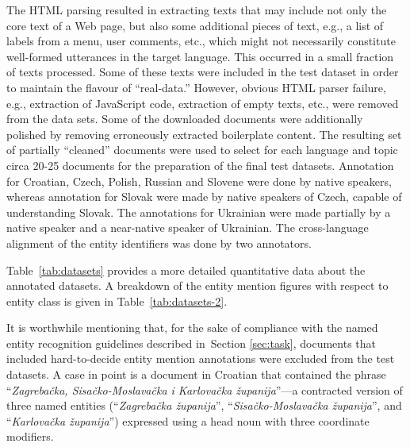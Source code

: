 \documentclass[11pt]{article}
\begin{document}
The HTML parsing resulted in extracting texts that may include not only
the core text of a Web page, but also some additional pieces of text,
e.g., a list of labels from a menu, user comments, etc., which might not
necessarily constitute well-formed utterances in the target language.
This occurred in a small fraction of texts processed.  Some of these
texts were included in the test dataset in order to maintain the flavour
of ``real-data.''  However, obvious HTML parser failure, e.g., extraction
of JavaScript code, extraction of empty texts, etc., were removed from
the data sets.  Some of the downloaded documents were additionally
polished by removing erroneously extracted boilerplate content.  The
resulting set of partially ``cleaned'' documents were used to select for
each language and topic circa 20-25 documents for the preparation of the
final test datasets.  Annotation for Croatian, Czech, Polish, Russian and
Slovene were done by native speakers, whereas annotation for Slovak were made 
by native speakers of Czech, capable of understanding Slovak. The annotations 
for Ukrainian were made partially by a native speaker and a near-native speaker 
of Ukrainian. The cross-language alignment of the entity identifiers was done 
by two annotators.

Table~\ref{tab:datasets} provides a more detailed quantitative data about the annotated datasets. A breakdown 
of the entity mention figures with respect to entity class is given in Table~\ref{tab:datasets-2}. 

It is worthwhile mentioning that, for the sake of compliance with the
named entity recognition guidelines described in~Section \ref{sec:task},
documents that included hard-to-decide entity mention annotations were
excluded from the test datasets. {A case in point is a document in
  Croatian that contained the phrase ``\textit{Zagrebačka,
    Sisačko-Moslavačka i Karlovačka županija}''---a contracted version of
  three named entities (``\textit{Zagrebačka županija}'',
  ``\textit{Sisačko-Moslavačka županija}'', and ``\textit{Karlovačka
    županija}'') expressed using a head noun with three coordinate
  modifiers.}
\end{document}
